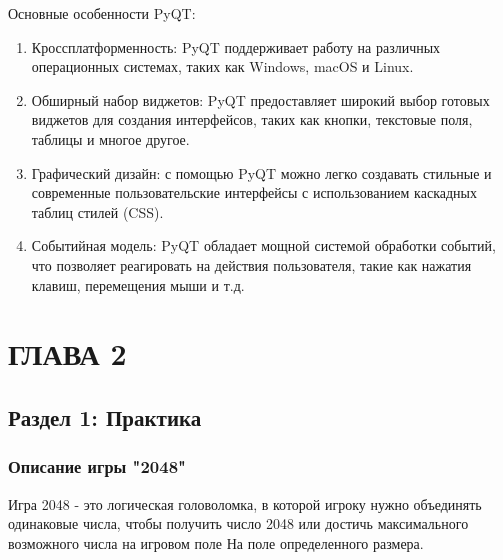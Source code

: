 Основные особенности PyQT:
\begin{enumerate}
\item Кроссплатформенность: PyQT поддерживает работу на различных операционных системах, таких как Windows, macOS и Linux.
\item Обширный набор виджетов: PyQT предоставляет широкий выбор готовых виджетов для создания интерфейсов, таких как кнопки, текстовые поля, таблицы и многое другое.
\item Графический дизайн: с помощью PyQT можно легко создавать стильные и современные пользовательские интерфейсы с использованием каскадных таблиц стилей (CSS).
\item  Событийная модель: PyQT обладает мощной системой обработки событий, что позволяет реагировать на действия пользователя, такие как нажатия клавиш, перемещения мыши и т.д.
\end{enumerate}

\subsection{\label{subsec:ch01/sec01/sub01} }

\chapter{\label{ch:ch02}ГЛАВА 2} 

\section{\label{sec:ch01/sec01}Раздел 1: Практика}

\subsection{\label{subsec:ch01/sec01/sub01}Описание игры "2048"}

Игра 2048 - это логическая головоломка, в которой игроку нужно объединять одинаковые числа, чтобы получить число 2048 или достичь максимального возможного числа на игровом поле На поле определенного размера.

